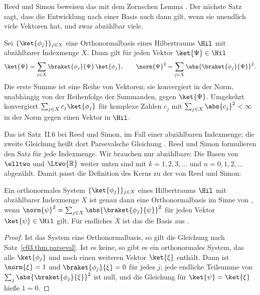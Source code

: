 \begin{vertiefung}
  Reed und Simon beweisen das mit dem Zornschen Lemma . Der
  nächste Satz sagt, dass die Entwicklung nach einer Basis auch dann gilt, wenn sie
  unendlich viele Vektoren hat, und zwar abzählbar viele.

  \begin{theorem}\label{c03.thm.parseval}
    Sei $\{\ket{\phi_j}\}_{j \in X}$ eine Orthonormalbasis eines Hilbertraums $\Hil$ mit
    abzählbarer Indexmenge $X$. Dann gilt für jeden Vektor $\ket{\Psi} \in \Hil$
    \begin{equation}\label{c03.eq.parseval}
      \ket{\Psi} = \sum_{j \in X} \braket{\phi_j}{\Psi}\, \ket{\phi_j} ,
      \qquad
      \norm{\Psi}^2 = \sum_{j \in X} \abs{\braket{\phi_j}{\Psi}}^2 .
    \end{equation}
    Die erste Summe ist eine Reihe von Vektoren; sie konvergiert in der Norm, unabhängig von
    der Reihenfolge der Summanden, gegen $\ket{\Psi}$. Umgekehrt konvergiert
    $\sum_{j \in X} c_j \ket{\phi_j}$ für komplexe Zahlen $c_j$ mit
    $\sum_{j \in X} \abs{c_j}^2 < \infty$ in der Norm gegen einen Vektor in $\Hil$.
  \end{theorem}

  Das ist Satz~II.6 bei Reed und Simon, im Fall einer abzählbaren Indexmenge; die zweite
  Gleichung heißt dort Parsevalsche Gleichung . Reed und
  Simon formulieren den Satz für jede Indexmenge. Wir brauchen nur abzählbare: Die Basen von
  $\elltwo$ und $\Ltwo{\mathbb{R}}$ weiter unten sind mit $k = 1, 2, 3, \dots$ und
  $n = 0, 1, 2, \dots$ abgezählt. Damit passt die Definition des Kerns zu der von Reed und
  Simon:

  \begin{proposition}\label{c03.prop.maximal}
    Ein orthonormales System $\{\ket{\phi_j}\}_{j \in X}$ eines Hilbertraums $\Hil$ mit
    abzählbarer Indexmenge $X$ ist genau dann eine Orthonormalbasis im Sinne von
    , wenn
    $\norm{\psi}^2 = \sum_{j \in X} \abs{\braket{\phi_j}{\psi}}^2$ für jeden Vektor
    $\ket{\psi} \in \Hil$ gilt. Für endliches $X$ ist das die Basis aus .
  \end{proposition}
  \begin{proof}
    Ist das System eine Orthonormalbasis, so gilt die Gleichung nach
    Satz~\ref{c03.thm.parseval}. Ist es keine, so gibt es ein orthonormales System, das alle
    $\ket{\phi_j}$ und noch einen weiteren Vektor $\ket{\xi}$ enthält. Dann ist
    $\norm{\xi} = 1$ und $\braket{\phi_j}{\xi} = 0$ für jedes $j$; jede endliche Teilsumme
    von $\sum_j \abs{\braket{\phi_j}{\xi}}^2$ ist null, und die Gleichung für
    $\ket{\psi} = \ket{\xi}$ hieße $1 = 0$.
  \end{proof}


\end{vertiefung}
